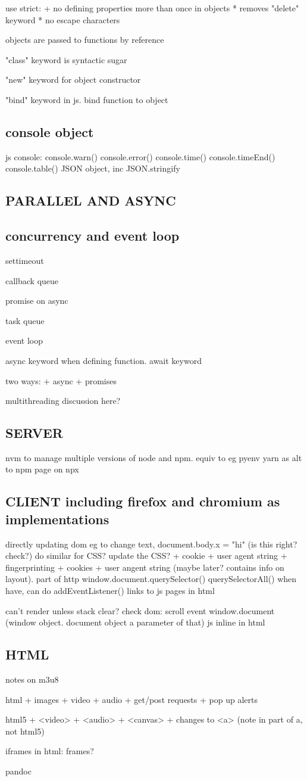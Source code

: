 use strict:
+ no defining properties more than once in objects
  * removes "delete" keyword
  * no escape characters

objects are passed to functions by reference

"class" keyword is syntactic sugar

"new" keyword for object constructor

"bind" keyword in js. bind function to object
\subsection{console object}
js console:
console.warn()
console.error()
console.time()
console.timeEnd()
console.table()
JSON object, inc JSON.stringify
\subsection{PARALLEL AND ASYNC}
\subsection{concurrency and event loop}
settimeout

callback queue

promise on async

task queue

event loop

async keyword when defining function. await keyword

two ways:
+ async
+ promises

multithreading discussion here?
\subsection{SERVER}
nvm to manage multiple versions of node and npm. equiv to eg pyenv
yarn as alt to npm
page on npx
\subsection{CLIENT including firefox and chromium as implementations}
directly updating dom
eg to change text, document.body.x = "hi" (is this right? check?)
do similar for CSS? update the CSS?
+ cookie
+ user agent string
+ fingerprinting
+ cookies
+ user angent string (maybe later? contains info on layout). part of http
window.document.querySelector()
querySelectorAll()
when have, can do addEventListener()
links to js pages in html

can't render unless stack clear? check
dom: scroll event
window.document (window object. document object a parameter of that)
js inline in html

\subsection{HTML}
notes on m3u8

html
+ images
+ video
+ audio
+ get/post requests
+ pop up alerts


html5
+ <video>
+ <audio>
+ <canvas>
+ changes to <a> (note in part of a, not html5)


iframes
in html: frames?

pandoc

